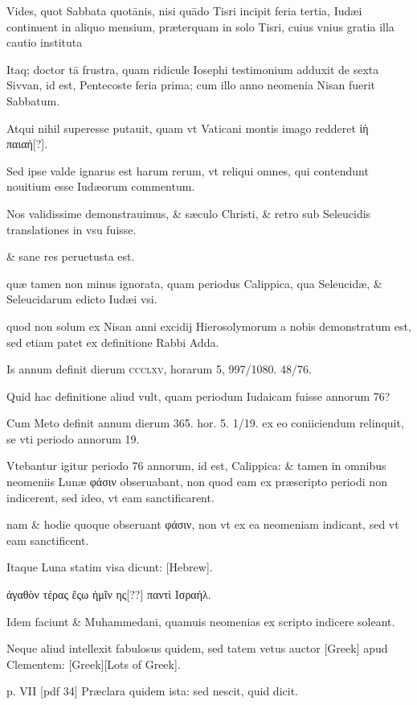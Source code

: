 \begin{parnumbers}
Vides, quot Sabbata quotānis, nisi quādo Tisri incipit feria tertia, Iudæi
continuent in aliquo mensium, præterquam in solo Tisri, cuius
vnius gratia illa cautio instituta

Itaq; doctor tā frustra, quam ridicule
Iosephi testimonium adduxit de sexta Sivvan, id est, Pentecoste
feria prima; cum illo anno neomenia Nisan fuerit Sabbatum.

Atqui
nihil superesse putauit, quam vt Vaticani montis imago redderet
\textgreek{ἰὴ παιαή[?]}.

Sed ipse valde ignarus est harum rerum, vt reliqui omnes,
qui contendunt nouitium esse Iudæorum commentum.

Nos
validissime demonstrauimus, \& sæculo Christi, \& retro sub Seleucidis
translationes in vsu fuisse.

\& sane res peruetusta est.

quæ tamen
non minus ignorata, quam periodus Calippica, qua Seleucidæ, \&
Seleucidarum edicto Iudæi vsi.

quod non solum ex Nisan anni excidij
Hierosolymorum a nobis demonstratum est, sed etiam patet
ex definitione Rabbi Adda.

Is annum definit dierum \textsc{ccclxv},
horarum 5, 997/1080. 48/76.

Quid hac definitione aliud vult, quam periodum
Iudaicam fuisse annorum 76?

Cum Meto definit annum dierum
365. hor. 5. 1/19. ex eo coniiciendum relinquit, se vti periodo annorum
19.

Vtebantur igitur periodo 76 annorum, id est, Calippica:
\& tamen in omnibus neomeniis Lunæ \textgreek{φάσιν} obseruabant, non
quod eam ex præscripto periodi non indicerent, sed ideo, vt eam
sanctificarent.

nam \& hodie quoque obseruant \textgreek{φάσιν}, non vt ex ea
neomeniam indicant, sed vt eam sanctificent.

Itaque Luna statim
visa dicunt: \texthebrew{[Hebrew]}.

\textgreek{ἀγαθὸν τέρας ἔςω ἡμῖν ης[??] παντὶ Ισραήλ.}

Idem faciunt \& Muhammedani, quamuis neomenias ex
scripto indicere soleant.

Neque aliud intellexit fabulosus quidem,
sed tatem vetus auctor \textgreek{[Greek]} apud Clementem:
\textgreek{[Greek][Lots of Greek]}.

\clearpage
p. VII [pdf 34]
Præclara quidem ista: sed nescit, quid dicit.


\end{parnumbers}
